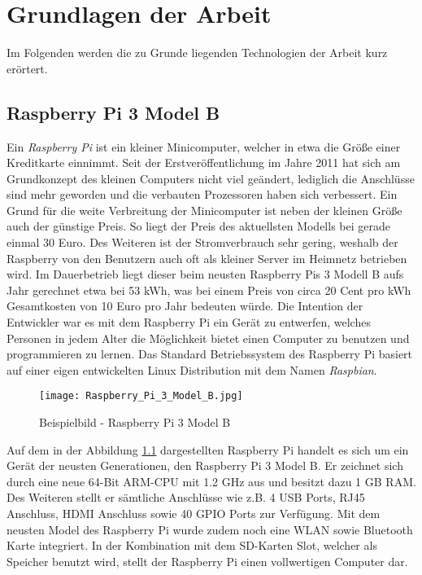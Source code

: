 
\chapter{Grundlagen der Arbeit}

Im Folgenden werden die zu Grunde liegenden Technologien der Arbeit kurz erörtert.

\section{Raspberry Pi 3 Model B}
Ein \textit{Raspberry Pi} ist ein kleiner Minicomputer, welcher in etwa die
Größe einer Kreditkarte einnimmt. Seit der Erstveröffentlichung im Jahre 2011
hat sich am Grundkonzept des kleinen Computers nicht viel
geändert, lediglich die Anschlüsse sind mehr geworden und die verbauten
Prozessoren haben sich verbessert. 
Ein Grund für die weite Verbreitung der Minicomputer ist neben der kleinen
Größe auch der günstige Preis. So liegt der Preis des aktuellsten Modells bei
gerade einmal 30 Euro. Des Weiteren ist der Stromverbrauch sehr gering,
weshalb der Raspberry von den Benutzern auch oft als kleiner Server im Heimnetz
betrieben wird. Im Dauerbetrieb liegt dieser beim neusten Raspberry
Pis 3 Modell B aufs Jahr gerechnet etwa bei 53 kWh, was bei einem Preis von
circa 20 Cent pro kWh Gesamtkosten von 10 Euro pro Jahr bedeuten würde. \newline
Die Intention der Entwickler war es mit dem Raspberry Pi ein Gerät zu
entwerfen, welches Personen in jedem Alter die Möglichkeit bietet einen
Computer zu benutzen und programmieren zu lernen. Das Standard Betriebssystem
des Raspberry Pi basiert auf einer eigen entwickelten Linux Distribution mit
dem Namen \textit{Raspbian}.
\autocite{what_is_a_raspberry_pi?_2019}
\begin{figure}[h]
	\centering
	\texttt{[image: Raspberry\_Pi\_3\_Model\_B.jpg]}
	\caption{Beispielbild - Raspberry Pi 3 Model B \autocite{raspberry_pi_2019}}
	\label{img:grafik-RaspberryPi3}
\end{figure}
\newline

Auf dem in der Abbildung \ref{img:grafik-RaspberryPi3} dargestellten Raspberry
Pi handelt es sich um ein Gerät der neusten Generationen, den Raspberry Pi 3
Model B. Er zeichnet sich durch eine neue 64-Bit \ac{ARM}-\ac{CPU} mit 1.2
\ac{GHz} aus und besitzt dazu 1 \ac{GB} \ac{RAM}. Des Weiteren stellt er
sämtliche Anschlüsse wie z.B. 4 \ac{USB} Ports, RJ45 Anschluss, \ac{HDMI}
Anschluss sowie 40 \ac{GPIO} Ports zur Verfügung. Mit dem neusten Model des
Raspberry Pi wurde zudem noch eine \ac{WLAN} sowie Bluetooth Karte integriert.
In der Kombination mit dem \ac{SD-Karten} Slot, welcher als Speicher benutzt
wird, stellt der Raspberry Pi einen vollwertigen Computer dar.
\autocite{kurniawan_2016}
 
